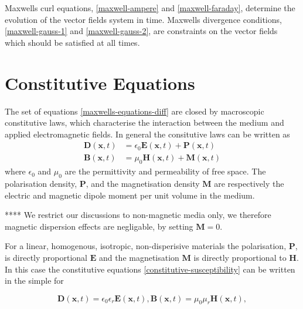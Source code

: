 Maxwells curl equations, \ref{maxwell-ampere} and \ref{maxwell-faraday}, determine the evolution of the vector fields system in time. Maxwells divergence conditions, \ref{maxwell-gauss-1} and \ref{maxwell-gauss-2}, are constraints on the vector fields which should be satisfied at all times.

\section{Constitutive Equations}

The set of equations \ref{maxwells-equations-diff} are closed by macroscopic constitutive laws, which characterise the interaction between the medium and applied electromagnetic fields. In general the consitutive laws can be written as
\begin{subequations}
    \label{constitutive-general}
    \begin{align}
        \mathbf{D}(\mathbf{x},t) &= \epsilon_0 \mathbf{E}(\mathbf{x},t) + \mathbf{P}(\mathbf{x},t) \label{constitutive-general-E} \\
        \mathbf{B}(\mathbf{x},t) &= \mu_0 \mathbf{H}(\mathbf{x},t) + \mathbf{M}(\mathbf{x},t)
    \end{align}
\end{subequations}
where $\epsilon_0$ and $\mu_0$ are the permittivity and permeability of free space. The polarisation density, $\mathbf{P}$, and the magnetisation density $\mathbf{M}$ are respectively the electric and magnetic dipole moment per unit volume in the medium.


**** We restrict our discussions to non-magnetic media only, we therefore magnetic dispersion effects are negligable, by setting $\mathbf{M} = 0$.


For a linear, homogenous, isotropic, non-disperisive materials the polarisation, $\mathbf{P}$, is directly proportional $\mathbf{E}$ and the magnetisation $\mathbf{M}$ is directly proportional to $\mathbf{H}$. In this case the constitutive equations \ref{constitutive-susceptibility} can be written in the simple for

$$
    \mathbf{D}(\mathbf{x},t) = \epsilon_0 \epsilon_r \mathbf{E}(\mathbf{x},t),
    \mathbf{B}(\mathbf{x},t) = \mu_0 \mu_r \mathbf{H}(\mathbf{x},t),
    \label{constitutive-susceptibility}
$$

